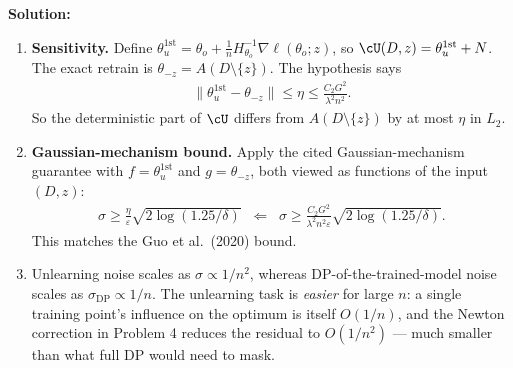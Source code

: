 \documentclass[12pt]{article}
\begin{document}
\begin{enumerate}
\begin{solution}
{\bf Solution:}\\
\begin{enumerate}
    \item \textbf{Sensitivity.} Define $\theta_u^{\mathrm{1st}} = \theta_o + \frac{1}{n}H_{\theta_o}^{-1}\nabla\ell(\theta_o; z)$, so $\cU(D, z) = \theta_u^{\mathrm{1st}} + N$. The exact retrain is $\theta_{-z} = A(D \setminus \{z\})$. The hypothesis says
    \begin{align*}
        \|\theta_u^{\mathrm{1st}} - \theta_{-z}\| \le \eta \le \frac{C_2 G^2}{\lambda^2 n^2}.
    \end{align*}
    So the deterministic part of $\cU$ differs from $A(D \setminus \{z\})$ by at most $\eta$ in $L_2$.

    \item \textbf{Gaussian-mechanism bound.} Apply the cited Gaussian-mechanism guarantee with $f = \theta_u^{\mathrm{1st}}$ and $g = \theta_{-z}$, both viewed as functions of the input $(D, z)$:
    \begin{align*}
        \sigma \ge \frac{\eta}{\varepsilon}\sqrt{2\log(1.25/\delta)} \;\;\Longleftarrow\;\; \sigma \ge \frac{C_2 G^2}{\lambda^2 n^2 \varepsilon}\sqrt{2\log(1.25/\delta)}.
    \end{align*}
    This matches the Guo et al.\ (2020) bound.

    \item Unlearning noise scales as $\sigma \propto 1/n^2$, whereas DP-of-the-trained-model noise scales as $\sigma_{\mathrm{DP}} \propto 1/n$. The unlearning task is \emph{easier} for large $n$: a single training point's influence on the optimum is itself $O(1/n)$, and the Newton correction in Problem 4 reduces the residual to $O(1/n^2)$ --- much smaller than what full DP would need to mask.
\end{enumerate}
\end{solution}



\end{enumerate}
\end{document}
